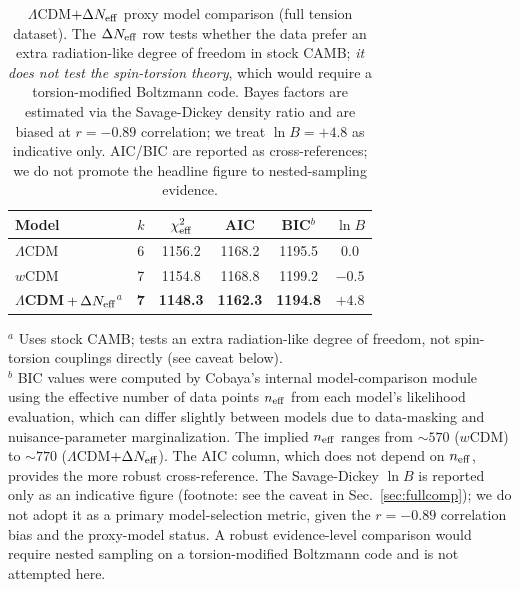 \documentclass[aps,prd,twocolumn,superscriptaddress,showpacs,preprintnumbers,nofootinbib,longbibliography,floatfix]{revtex4-2}
\newcommand{\Neff}{N_{\rm eff}}
\begin{document}
\begin{table}[tb]
\caption{\label{tab:modelcomp} $\Lambda$CDM$+\Delta\Neff$ proxy model comparison (full tension dataset). The $\Delta\Neff$ row tests whether the data prefer an extra radiation-like degree of freedom in stock CAMB; \emph{it does not test the spin-torsion theory}, which would require a torsion-modified Boltzmann code. Bayes factors are estimated via the Savage-Dickey density ratio and are biased at $r=-0.89$ correlation; we treat $\ln B = +4.8$ as indicative only. AIC/BIC are reported as cross-references; we do not promote the headline figure to nested-sampling evidence.}
\begin{ruledtabular}
\begin{tabular}{lccccc}
Model & $k$ & $\chi^2_{\rm eff}$ & AIC & BIC$^b$ & $\ln B$ \\
\hline
$\Lambda$CDM & 6 & 1156.2 & 1168.2 & 1195.5 & 0.0 \\
$w$CDM & 7 & 1154.8 & 1168.8 & 1199.2 & $-0.5$ \\
\textbf{$\Lambda$CDM$\,+\,\Delta N_{\rm eff}$}$^a$ & \textbf{7} & \textbf{1148.3} & \textbf{1162.3} & \textbf{1194.8} & $\mathbf{+4.8}$ \\
\end{tabular}
\end{ruledtabular}
$^a$ Uses stock CAMB; tests an extra radiation-like degree of freedom, not spin-torsion couplings directly (see caveat below).\\
$^b$ BIC values were computed by Cobaya's internal model-comparison module using the effective number of data points $n_{\rm eff}$ from each model's likelihood evaluation, which can differ slightly between models due to data-masking and nuisance-parameter marginalization. The implied $n_{\rm eff}$ ranges from $\sim 570$ ($w$CDM) to $\sim 770$ ($\Lambda$CDM$+\Delta\Neff$). The AIC column, which does not depend on $n_{\rm eff}$, provides the more robust cross-reference. The Savage-Dickey $\ln B$ is reported only as an indicative figure (footnote: see the caveat in Sec.~\ref{sec:fullcomp}); we do not adopt it as a primary model-selection metric, given the $r=-0.89$ correlation bias and the proxy-model status. A robust evidence-level comparison would require nested sampling on a torsion-modified Boltzmann code and is not attempted here.
\end{table}
\end{document}
